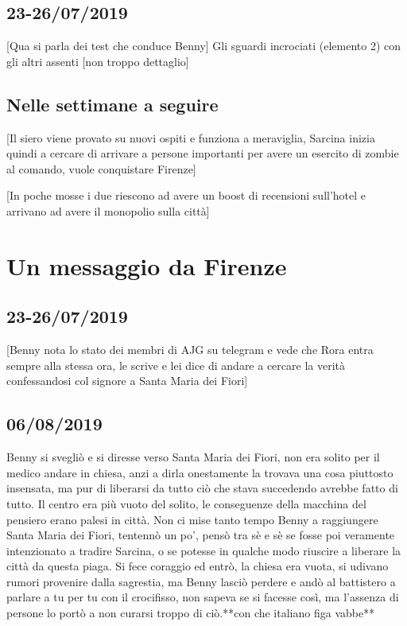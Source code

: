 \subsection*{23-26/07/2019}
[Qua si parla dei test che conduce Benny]
Gli sguardi incrociati (elemento 2) con gli altri assenti [non troppo dettaglio]


\subsection*{Nelle settimane a seguire}
[Il siero viene provato su nuovi ospiti e funziona a meraviglia, Sarcina inizia quindi a cercare di arrivare a persone importanti per avere un esercito di zombie al comando, vuole conquistare Firenze]

[In poche mosse i due riescono ad avere un boost di recensioni sull'hotel e arrivano ad avere il monopolio sulla città]


\section{Un messaggio da Firenze}

\subsection*{23-26/07/2019}

[Benny nota lo stato dei membri di AJG su telegram e vede che Rora entra sempre alla stessa ora, le scrive e lei dice di andare a cercare la verità confessandosi col signore a Santa Maria dei Fiori]
\subsection*{06/08/2019}

Benny si svegliò e si diresse verso Santa Maria dei Fiori, non era solito per il medico andare in chiesa, anzi a dirla onestamente la trovava una cosa piuttosto insensata, ma pur di liberarsi da tutto ciò che stava succedendo avrebbe fatto di tutto. Il centro era più vuoto del solito, le conseguenze della macchina del pensiero erano palesi in città. Non ci mise tanto tempo Benny a raggiungere Santa Maria dei Fiori, tentennò un po', pensò tra sè e sè se fosse poi veramente intenzionato a tradire Sarcina, o se potesse in qualche modo riuscire a liberare la città da questa piaga. Si fece coraggio ed entrò, la chiesa era vuota, si udivano rumori provenire dalla sagrestia, ma Benny lasciò perdere e andò al battistero a parlare a tu per tu con il crocifisso, non sapeva se si facesse così, ma l'assenza di persone lo portò a non curarsi troppo di ciò.**con che italiano figa vabbe**

